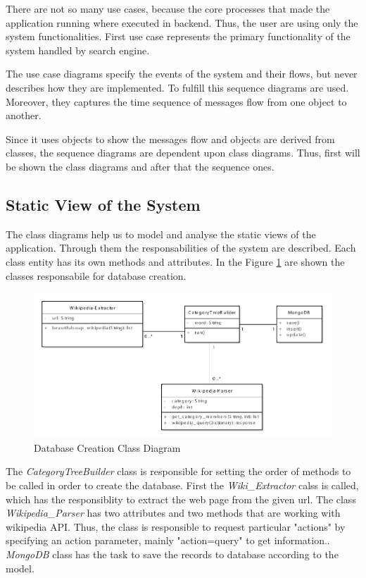 There are not so many use cases, because the core processes that made the application running where executed in backend. Thus, the user are using only the system functionalities. First use case represents the primary functionality of the system handled by search engine. 

The use case diagrams specify the events of the system and their flows, but never describes how they are implemented. To fulfill this sequence diagrams are used. Moreover, they captures the time sequence of messages flow from one object to another. 

Since it uses objects to show the messages flow and objects are derived from classes, the sequence diagrams are dependent upon class diagrams. Thus, first will be shown the class diagrams and after that the sequence ones. 

\subsection{Static View of the System}

The class diagrams help us to model and analyse the static views of the application. Through them the responsabilities of the system are described. Each class entity has its own methods and attributes. In the Figure \ref{classCreate_uml} are shown the classes responsabile for database creation. 

\begin{figure}[!ht]
\centering
\includegraphics[width=15cm]{create-db}
\caption{Database Creation Class Diagram}\label{classCreate_uml}
\end{figure}

The \textit{CategoryTreeBuilder} class is responsible for setting the order of methods to be called in order to create the database. First the \textit{Wiki\_Extractor} calss is called, which has the responsiblity to extract the web page from the given url. The class \textit{Wikipedia\_Parser} has two attributes and two methods that are working with wikipedia API. Thus, the class is responsible to request particular "actions" by specifying an action parameter, mainly "action=query" to get information.. \textit{MongoDB} class has the task to save the records to database according to the model.  

